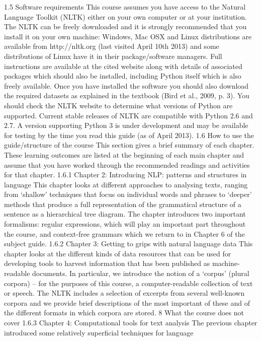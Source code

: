 1.5 Software requirements
This course assumes you have access to the Natural Language Toolkit (NLTK) either
on your own computer or at your institution. The NLTK can be freely downloaded
and it is strongly recommended that you install it on your own machine: Windows,
Mac OSX and Linux distributions are available from http://nltk.org (last visited
April 10th 2013) and some distributions of Linux have it in their package/software
managers. Full instructions are available at the cited website along with details of
associated packages which should also be installed, including Python itself which is
also freely available. Once you have installed the software you should also download
the required datasets as explained in the textbook (Bird et al., 2009, p. 3).
You should check the NLTK website to determine what versions of Python are
supported. Current stable releases of NLTK are compatible with Python 2.6 and 2.7.
A version supporting Python 3 is under development and may be available for
testing by the time you read this guide (as of April 2013).
1.6 How to use the guide/structure of the course
This section gives a brief summary of each chapter. These learning outcomes are
listed at the beginning of each main chapter and assume that you have worked
through the recommended readings and activities for that chapter.
1.6.1 Chapter 2: Introducing NLP: patterns and structures in language
This chapter looks at different approaches to analysing texts, ranging from ‘shallow’
techniques that focus on individual words and phrases to ‘deeper’ methods that
produce a full representation of the grammatical structure of a sentence as a
hierarchical tree diagram. The chapter introduces two important formalisms:
regular expressions, which will play an important part throughout the course, and
context-free grammars which we return to in Chapter 6 of the subject guide.
1.6.2 Chapter 3: Getting to grips with natural language data
This chapter looks at the different kinds of data resources that can be used for
developing tools to harvest information that has been published as machine-readable
documents. In particular, we introduce the notion of a ‘corpus’ (plural corpora) – for
the purposes of this course, a computer-readable collection of text or speech. The
NLTK includes a selection of excerpts from several well-known corpora and we
provide brief descriptions of the most important of these and of the different formats
in which corpora are stored.
8
What the course does not cover
1.6.3 Chapter 4: Computational tools for text analysis
The previous chapter introduced some relatively superficial techniques for language
